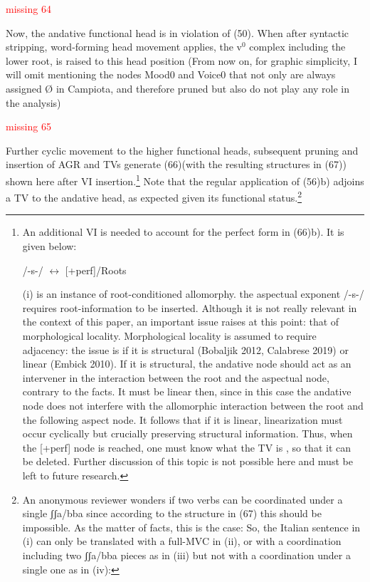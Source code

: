 \documentclass[output=paper,colorlinks,citecolor=brown,
]{langscibook}
\begin{document}
\ea
\textcolor{red}{missing 64}
\z

Now, the andative functional head is in violation of (50).  When after syntactic stripping, word-forming head movement applies, the v$^0$ complex including the lower root, is raised to this head position (From now on, for graphic simplicity, I will omit mentioning the nodes Mood0 and Voice0 that not only are always assigned Ø in Campiota, and therefore pruned but also do not play any role in the analysis)

\ea
\textcolor{red}{missing 65}
\z

Further cyclic movement to the higher functional heads, subsequent pruning and insertion of AGR and TVs generate (66)(with the resulting structures in (67)) shown here after VI insertion.\footnote{An additional VI is needed to account for the perfect form in (66)b).  It is given below:

\ea  /-s-/ $\longleftrightarrow$ [+perf]/Roots \underline{\hspace{2em}}
\z

(i) is an instance of root-conditioned allomorphy. the aspectual exponent /-s-/ requires root-information to be inserted. Although it is not really relevant in the context of this paper, an important issue raises at this point: that of morphological locality.  Morphological locality is assumed to require adjacency: the issue is if it is structural (Bobaljik 2012, Calabrese 2019) or linear (Embick 2010).  If it is structural, the andative node should act as an intervener in the interaction between the root and the aspectual node, contrary to the facts. It must be linear then, since in this case the andative node does not interfere with the allomorphic interaction between the root and the following aspect node. It follows that if it is linear, linearization must occur cyclically but crucially preserving structural information. Thus, when the [+perf] node is reached, one must know what the TV is , so that it can be deleted. Further discussion of this topic is not possible here and must be left to future research.}    Note that the regular application of (56)b) adjoins a TV to the andative head, as expected given its functional status.\footnote{ An anonymous reviewer wonders if two verbs can be coordinated under a single ʃʃa/bba since according to the structure in (67) this should be impossible. As the matter of facts, this is the case: So, the Italian sentence in (i) can only be translated with a full-MVC in (ii), or with a coordination including two ʃʃa/bba pieces as in (iii) but not with a coordination under a single one as in (iv):

}
\end{document}
